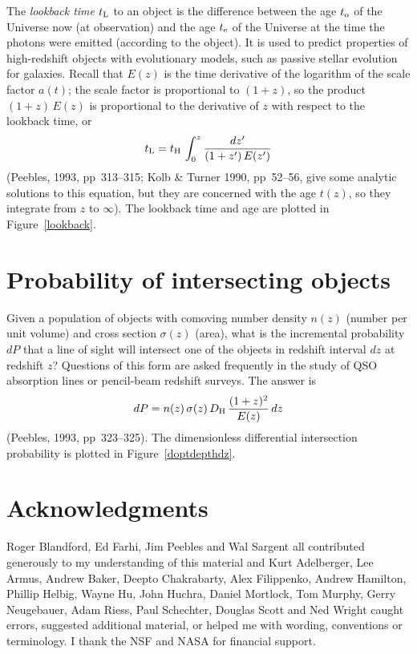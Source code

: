 The {\em lookback time\/} $t_{\rm L}$ to an object is the difference
between the age $t_{\rm o}$ of the Universe now (at observation) and
the age $t_{\rm e}$ of the Universe at the time the photons were
emitted (according to the object).  It is used to predict properties
of high-redshift objects with evolutionary models, such as passive
stellar evolution for galaxies.  Recall that $E(z)$ is the time
derivative of the logarithm of the scale factor $a(t)$; the scale
factor is proportional to $(1+z)$, so the product $(1+z)\,E(z)$ is
proportional to the derivative of $z$ with respect to the lookback
time, or
\begin{equation}
t_{\rm L} = t_{\rm H}\,\int_0^z \frac{dz'}{(1+z')\,E(z')}
\end{equation}
(Peebles, 1993, pp~313--315; Kolb \& Turner 1990, pp~52--56, give some
analytic solutions to this equation, but they are concerned with the
age $t(z)$, so they integrate from $z$ to $\infty$).  The lookback
time and age are plotted in Figure~\ref{lookback}.


\section{Probability of intersecting objects}
\label{sec:optdepth}

Given a population of objects with comoving number density $n(z)$
(number per unit volume) and cross section $\sigma(z)$ (area), what is
the incremental probability $dP$ that a line of sight will intersect
one of the objects in redshift interval $dz$ at redshift $z$?
Questions of this form are asked frequently in the study of QSO
absorption lines or pencil-beam redshift surveys.  The answer is
\begin{equation}
dP=n(z)\,\sigma(z)\,D_{\rm H}\,\frac{(1+z)^2}{E(z)}\,dz
\end{equation}
(Peebles, 1993, pp~323--325).  The dimensionless differential
intersection probability is plotted in Figure~\ref{doptdepthdz}.


\section*{Acknowledgments}

Roger Blandford, Ed Farhi, Jim Peebles and Wal Sargent all contributed
generously to my understanding of this material and Kurt Adelberger,
Lee Armus, Andrew Baker, Deepto Chakrabarty, Alex Filippenko, Andrew
Hamilton, Phillip Helbig, Wayne Hu, John Huchra, Daniel Mortlock, Tom
Murphy, Gerry Neugebauer, Adam Riess, Paul Schechter, Douglas Scott
and Ned Wright caught errors, suggested additional material, or helped
me with wording, conventions or terminology.  I thank the NSF and NASA
for financial support.

